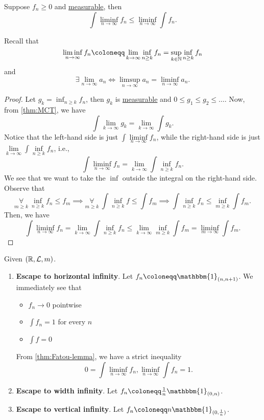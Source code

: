 \begin{theorem}\label{thm:Fatou-lemma}
	Suppose \(f_{n}\geq 0\) and \hyperref[def:measurable-function]{measurable}, then
	\[
		\int \liminf_{n \to \infty} f_{n}\leq \liminf_{n \to \infty} \int f_{n}.
	\]
\end{theorem}
\begin{remark}
	Recall that
	\[
		\liminf_{n \to \infty} f_{n} \coloneqq \lim\limits_{k \to \infty} \inf_{n\geq k}f_{n} = \sup _{k\in\mathbb{\MakeUppercase{n}} }\inf _{n\geq k}f_{n}
	\]
	and
	\[
		\exists\lim\limits_{n \to \infty} a_{n}\iff \limsup_{n \to \infty} a_{n} = \liminf_{n \to \infty} a_{n}.
	\]
\end{remark}
\begin{proof}
	Let \(g_{k} = \inf _{n\geq k}f_{n}\), then \(g_{k}\) is \hyperref[def:measurable-function]{measurable} and \(0\leq g_1 \leq g_2 \leq \ldots  \). Now, from \autoref{thm:MCT}, we have
	\[
		\int \lim\limits_{k \to \infty}  g_{k} = \lim\limits_{k \to \infty} \int g_{k}.
	\]
	Notice that the left-hand side is just \(\int \liminf\limits_{n \to \infty} f_{n}\), while the right-hand side is just \(\lim\limits_{k \to \infty} \int \inf\limits _{n\geq k}f_{n}\),
	i.e.,
	\[
		\int \liminf_{n \to \infty} f_{n} = \lim\limits_{k \to \infty} \int \inf _{n\geq k}f_{n}.
	\]
	We see that we want to take the \(\inf\) outside the integral on the right-hand side. Observe that
	\[
		\underset{m\geq k}{\forall }\ \inf _{n\geq k}f_{n}\leq f _{m} \implies \underset{m\geq k}{\forall }\ \int \inf _{n\geq k}f\leq \int f _{m}\implies \int \inf _{n\geq k}f_{n}\leq \inf_{m\geq k}\int f _{m}.
	\]
	Then, we have
	\[
		\int \liminf_{n \to \infty} f_{n} = \lim\limits_{k \to \infty} \int \inf _{n\geq k}f_{n}\leq \lim\limits_{k \to \infty} \inf _{m\geq k}\int f _{m} = \liminf_{m \to \infty} \int f _{m}.
	\]
\end{proof}

\begin{eg}
	Given \((\mathbb{\MakeUppercase{r}} , \mathcal{\MakeUppercase{l}} , m)\).
	\begin{enumerate}
		\item \textbf{Escape to horizontal infinity}. Let \(f_{n}\coloneqq \mathbbm{1}_{(n, n+1)} \). We immediately see that
		      \begin{itemize}
			      \item \(f_{n}\to 0\) pointwise
			      \item \(\int f_{n} = 1\) for every \(n\)
			      \item \(\int f = 0\)
		      \end{itemize}
		      From \autoref{thm:Fatou-lemma}, we have a strict inequality
		      \[
			      0 = \int \liminf_{n \to \infty} f_{n} , \liminf_{n \to \infty} \int f_{n} = 1.
		      \]
		\item \textbf{Escape to width infinity}. Let \(f_{n}\coloneqq \frac{1}{n}\mathbbm{1}_{(0, n)} \).
		\item \textbf{Escape to vertical infinity}. Let \(f_{n}\coloneqq n \mathbbm{1}_{(0, \frac{1}{n})} \).
	\end{enumerate}
\end{eg}

